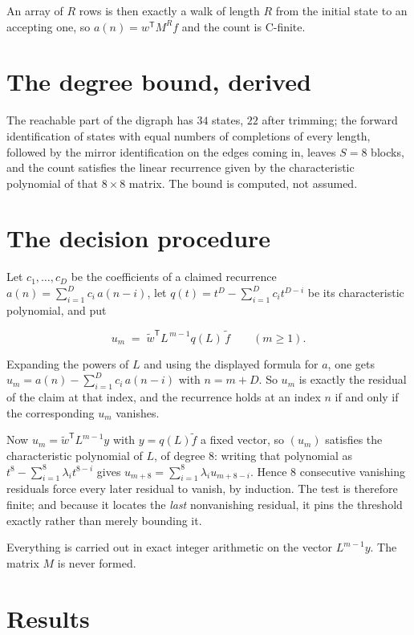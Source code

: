 \documentclass[11pt]{article}
\theoremstyle{definition}
\begin{document}
An array of $R$ rows is then exactly a walk of length $R$ from the initial state to an accepting one, so $a(n) = w^{\mathsf T}M^{R}f$ and the count is C-finite.

\section{The degree bound, derived}

The reachable part of the digraph has $34$ states, $22$ after trimming; the forward identification of states with equal numbers of completions of every length, followed by the mirror identification on the edges coming in, leaves $S = 8$ blocks, and the count satisfies the linear recurrence given by the characteristic polynomial of that $8\times8$ matrix. The bound is computed, not assumed.

\section{The decision procedure}

Let $c_1,\dots,c_D$ be the coefficients of a claimed recurrence $a(n) = \sum_{i=1}^{D} c_i\,a(n-i)$, let $q(t) = t^{D} - \sum_{i=1}^{D} c_i t^{D-i}$ be its characteristic polynomial, and put

\[u_m \;=\; \tilde w^{\mathsf T} L^{\,m-1} q(L)\,\tilde f \qquad (m \ge 1).\]

Expanding the powers of $L$ and using the displayed formula for $a$, one gets $u_m = a(n) - \sum_{i=1}^{D} c_i\,a(n-i)$ with $n = m + D$. So $u_m$ is exactly the residual of the claim at that index, and the recurrence holds at an index $n$ if and only if the corresponding $u_m$ vanishes.

Now $u_m = \tilde w^{\mathsf T} L^{m-1} y$ with $y = q(L)\tilde f$ a fixed vector, so $(u_m)$ satisfies the characteristic polynomial of $L$, of degree $8$: writing that polynomial as $t^{8} - \sum_{i=1}^{8} \lambda_i t^{8-i}$ gives $u_{m+8} = \sum_{i=1}^{8} \lambda_i u_{m+8-i}$. Hence $8$ consecutive vanishing residuals force every later residual to vanish, by induction. The test is therefore finite; and because it locates the {\itshape last} nonvanishing residual, it pins the threshold exactly rather than merely bounding it.

Everything is carried out in exact integer arithmetic on the vector $L^{m-1}y$. The matrix $M$ is never formed.

\section{Results}
\end{document}

